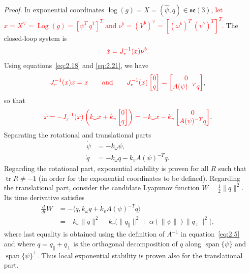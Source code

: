 \documentclass[11pt]{article}
\newcommand{\rev}[1]{\textcolor{red}{#1}}
\newcommand{\JR}{J_r}
\newcommand{\Log}{\operatorname{Log}}
\newcommand{\se}{\mathfrak{se}}
\newcommand{\tr}{\operatorname{tr}}
\begin{document}
\emph{Proof.} In exponential coordinates $\log(g)=X=(\widehat\psi,q)\in\se(3)$,
\rev{let $x=X^\vee=\Log(g)=[\psi^T\ q^T]^T$ and $\nu^b=(V^b)^\vee=[(\omega^b)^T\ (v^b)^T]^T$.} The closed-loop system is
\begin{equation*}
\rev{\dot x=\JR^{-1}(x)\nu^b}.
\end{equation*}
Using equations~\eqref{eq:2.18} and \eqref{eq:2.21}, we have
\begin{equation*}
\rev{\JR^{-1}(x)x=x\qquad\text{and}\qquad
\JR^{-1}(x)\begin{bmatrix}0\\q\end{bmatrix}
=\begin{bmatrix}0\\A(\psi)^{-T}q\end{bmatrix}},
\end{equation*}
so that
\begin{equation*}
\rev{\dot x=-\JR^{-1}(x)\left(k_\omega x+k_v\begin{bmatrix}0\\q\end{bmatrix}\right)
=-k_\omega x-k_v\begin{bmatrix}0\\A(\psi)^{-T}q\end{bmatrix}}.
\end{equation*}
Separating the rotational and translational parts
\begin{align*}
\dot\psi &=-k_\omega\psi,\\
\dot q &=-k_\omega q-k_vA(\psi)^{-T}q.
\end{align*}
Regarding the rotational part, exponential stability is proven for all $R$ such that $\tr R\neq-1$ (in order for the exponential coordinates to be defined). Regarding the translational part, consider the candidate Lyapunov function $W=\tfrac12\|q\|^2$. Its time derivative satisfies
\begin{align*}
\frac{d}{dt}W&=-\langle q,k_\omega q+k_vA(\psi)^{-T}q\rangle\\
&=-k_\omega\|q\|^2-k_v\bigl(\|q_{\parallel}\|^2+\alpha(\|\psi\|)\|q_{\perp}\|^2\bigr),
\end{align*}
where last equality is obtained using the definition of $A^{-1}$ in equation~\eqref{eq:2.5} and where $q=q_{\parallel}+q_{\perp}$ is the orthogonal decomposition of $q$ along $\operatorname{span}\{\psi\}$ and $\operatorname{span}\{\psi\}^{\perp}$. Thus local exponential stability is proven also for the translational part.
\end{document}
